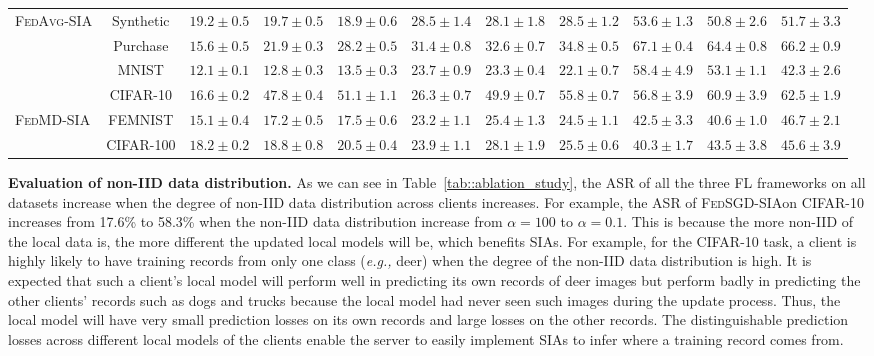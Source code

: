 \documentclass[10pt,journal,compsoc]{IEEEtran}
\newcommand*\fedavg{\textsc{FedAvg-SIA}}
\newcommand*\fedsgd{\textsc{FedSGD-SIA}}
\newcommand*\fedmd{\textsc{FedMD-SIA}}
\begin{document}
\begin{table*}[!t]
{\begin{tabular}{lclllllllll}
			                 \midrule
\multirow{4}{*}{\fedavg}    
& Synthetic & $ 19.2 \pm 0.5$   & $ 19.7 \pm 0.5 $ & $ 18.9 \pm 0.6$ & $ 28.5 \pm 1.4$  & $ 28.1 \pm 1.8$ & $28.5 \pm 1.2$ & $53.6 \pm 1.3 $ & $50.8 \pm 2.6$ & $51.7 \pm 3.3$   \\
& Purchase & $15.6 \pm 0.5$ & $ 21.9 \pm 0.3$ & $ 28.2 \pm 0.5$ & $31.4 \pm 0.8$ & $32.6 \pm 0.7$ & $ 34.8 \pm 0.5$ & $67.1 \pm 0.4$ & $64.4 \pm 0.8 $ & $66.2 \pm 0.9$ \\ 
& MNIST & $ 12.1 \pm 0.1$  & $ 12.8 \pm 0.3$ & $ 13.5 \pm 0.3$ & $ 23.7 \pm 0.9$ & $23.3 \pm 0.4$ & $ 22.1 \pm 0.7$ & $58.4 \pm 4.9$ & $53.1 \pm 1.1$ & $42.3 \pm 2.6$ \\
& CIFAR-10 & $ 16.6 \pm 0.2$  & $47.8 \pm 0.4$  & $51.1 \pm 1.1$ & $ 26.3 \pm 0.7$ & $ 49.9 \pm 0.7$  & $ 55.8 \pm 0.7 $ & $56.8 \pm 3.9$ & $60.9 \pm 3.9$ & $62.5 \pm 1.9$ \\ 
                            \midrule
\multirow{2}{*}{\fedmd} 
& FEMNIST & $ 15.1 \pm 0.4$ & $17.2 \pm 0.5$ & $17.5 \pm 0.6$ & $23.2 \pm 1.1$ & $25.4 \pm 1.3$ & $24.5 \pm 1.1$ & $42.5 \pm 3.3$ & $40.6 \pm 1.0$ & $46.7 \pm 2.1$  \\
& CIFAR-100 & $18.2 \pm 0.2$ & $ 18.8 \pm 0.8$ & $20.5 \pm 0.4$ & $23.9 \pm 1.1$ & $28.1 \pm 1.9$ & $25.5 \pm 0.6$ & $40.3 \pm 1.7$ & $43.5 \pm 3.8$ & $45.6 \pm 3.9$ \\
			\bottomrule
		\end{tabular}%
	}

\end{table*}

\noindent \textbf{Evaluation of non-IID data distribution. \;} As we can see in Table~\ref{tab::ablation_study}, the ASR of all the three FL frameworks on all datasets increase when the degree of non-IID data distribution across clients increases. For example, the ASR of \fedsgd\;on CIFAR-10 increases from 17.6\% to 58.3\% when the non-IID data distribution increase from $\alpha=100$ to $\alpha=0.1$. This is because the more non-IID of the local data is, the more different the updated local models will be, which benefits SIAs. For example, for the CIFAR-10 task, a client is highly likely to have training records from only one class ({\em e.g.,} deer) when the degree of the non-IID data distribution is high. It is expected that such a client's local model will perform well in predicting its own records of deer images but perform badly in predicting the other clients' records such as dogs and trucks because the local model had never seen such images during the update process. Thus, the local model will have very small prediction losses on its own records and large losses on the other records. The distinguishable prediction losses across different local models of the clients enable the server to easily implement SIAs to infer where a training record comes from. 
\end{document}
